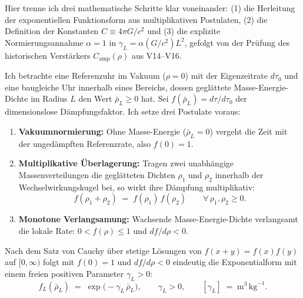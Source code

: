 \documentclass[10pt,a4paper]{article}
\begin{document}
Hier trenne ich drei mathematische Schritte klar voneinander: (1) die Herleitung der exponentiellen Funktionsform aus multiplikativen Postulaten, (2) die Definition der Konstanten $C \equiv 4\pi G/c^2$ und (3) die explizite Normierungsannahme $\alpha = 1$ in $\gamma_L = \alpha (G/c^2)L^2$, gefolgt von der Pr\"ufung des historischen Verst\"arkers $C_{\text{amp}}(\rho)$ aus V14--V16.

\par
Ich betrachte eine Referenzuhr im Vakuum ($\rho = 0$) mit der Eigenzeitrate $d\tau_0$ und eine baugleiche Uhr innerhalb eines Bereichs, dessen gegl\"attete Masse-Energie-Dichte im Radius $L$ den Wert $\bar{\rho}_L \ge 0$ hat. Sei $f(\bar{\rho}_L) = d\tau / d\tau_0$ der dimensionslose D\"ampfungsfaktor. Ich setze drei Postulate voraus:
\begin{enumerate}\setlength{\itemsep}{1pt}\setlength{\parskip}{0pt}\setlength{\topsep}{1pt}
  \item \textbf{Vakuumnormierung:} Ohne Masse-Energie ($\bar{\rho}_L = 0$) vergeht die Zeit mit der unged\"ampften Referenzrate, also $f(0) = 1$.
  \item \textbf{Multiplikative \"Uberlagerung:} Tragen zwei unabh\"angige Massenverteilungen die gegl\"atteten Dichten $\rho_1$ und $\rho_2$ innerhalb der Wechselwirkungskugel bei, so wirkt ihre D\"ampfung multiplikativ:
  \begin{equation}
    f(\rho_1 + \rho_2) \;=\; f(\rho_1)\,f(\rho_2) \qquad \forall\,\rho_1,\rho_2 \ge 0.
  \end{equation}
  \item \textbf{Monotone Verlangsamung:} Wachsende Masse-Energie-Dichte verlangsamt die lokale Rate: $0 < f(\rho) \le 1$ und $df/d\rho < 0$.
\end{enumerate}
Nach dem Satz von Cauchy \"uber stetige L\"osungen von $f(x+y)=f(x)f(y)$ auf $[0,\infty)$ folgt mit $f(0)=1$ und $df/d\rho < 0$ eindeutig die Exponentialform mit einem freien positiven Parameter $\gamma_L > 0$:
\begin{equation}
  f_L(\bar{\rho}_L) \;=\; \exp\!\bigl(-\gamma_L\,\bar{\rho}_L\bigr), \qquad \gamma_L > 0, \qquad [\gamma_L] \;=\; \text{m}^3\,\text{kg}^{-1}.
\end{equation}
\end{document}
